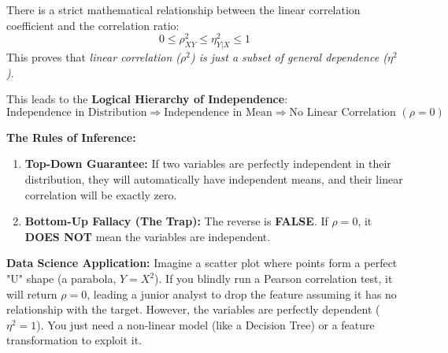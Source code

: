 There is a strict mathematical relationship between the linear correlation coefficient and the correlation ratio:
\begin{equation}
    0 \leq \rho_{XY}^2 \leq \eta_{Y|X}^2 \leq 1
\end{equation}
This proves that \textit{linear correlation ($\rho^2$) is just a subset of general dependence ($\eta^2$)}.

This leads to the \textbf{Logical Hierarchy of Independence}:
\begin{equation*}
    \text{Independence in Distribution} \Rightarrow \text{Independence in Mean} \Rightarrow \text{No Linear Correlation } (\rho=0)
\end{equation*}

\textbf{The Rules of Inference:}
\begin{enumerate}
    \item \textbf{Top-Down Guarantee:} If two variables are perfectly independent in their distribution, they will automatically have independent means, and their linear correlation will be exactly zero.
    \item \textbf{Bottom-Up Fallacy (The Trap):} The reverse is \textbf{FALSE}. If $\rho = 0$, it \textbf{DOES NOT} mean the variables are independent. 
\end{enumerate}



\textbf{Data Science Application:}
Imagine a scatter plot where points form a perfect "U" shape (a parabola, $Y = X^2$). 
If you blindly run a Pearson correlation test, it will return $\rho = 0$, leading a junior analyst to drop the feature assuming it has no relationship with the target. However, the variables are perfectly dependent ($\eta^2 = 1$). You just need a non-linear model (like a Decision Tree) or a feature transformation to exploit it.

